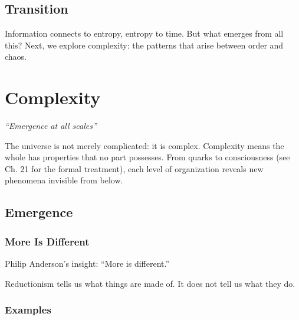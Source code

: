 \documentclass[
  11pt,
  letterpaper,
  twoside,
  openright]{book}
\begin{document}
\section{Transition}\label{transition-40}

Information connects to entropy, entropy to time. But what emerges from
all this? Next, we explore complexity: the patterns that arise between
order and chaos.

\chapter{Complexity}\label{sec-complexity}

\emph{``Emergence at all scales''}

\begin{tcolorbox}[enhanced jigsaw, coltitle=black, colbacktitle=quarto-callout-note-color!10!white, toprule=.15mm, colframe=quarto-callout-note-color-frame, arc=.35mm, opacityback=0, bottomtitle=1mm, toptitle=1mm, breakable, colback=white, titlerule=0mm, opacitybacktitle=0.6, title=\textcolor{quarto-callout-note-color}{\faInfo}\hspace{0.5em}{Key Revelation}, rightrule=.15mm, bottomrule=.15mm, leftrule=.75mm, left=2mm]

The universe is not merely complicated: it is complex. Complexity means
the whole has properties that no part possesses. From quarks to
consciousness (see Ch. 21 for the formal treatment), each level of
organization reveals new phenomena invisible from below.

\end{tcolorbox}

\section{Emergence}\label{emergence}

\subsection{More Is Different}\label{more-is-different}

Philip Anderson's insight: ``More is different.''

Reductionism tells us what things are made of. It does not tell us what
they do.

\subsection{Examples}\label{examples-7}
\end{document}
